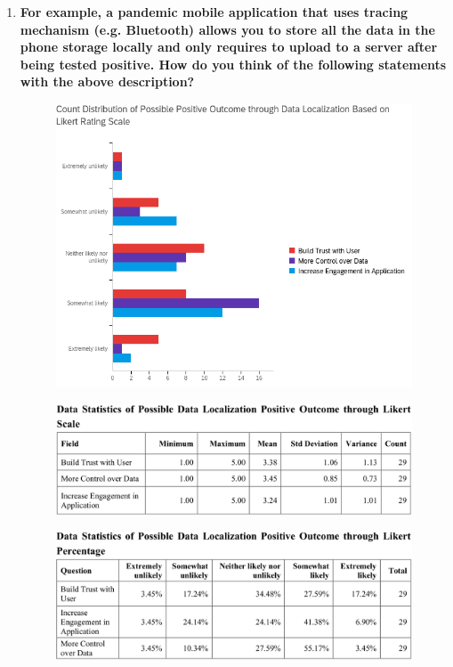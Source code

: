 \begin{enumerate}
\begin{figure}[H]
  \end{figure}
  \item \textbf{For example, a pandemic mobile application that uses tracing mechanism (e.g. Bluetooth) allows you to store all the data in the phone storage locally and only requires to upload to a server after being tested positive. How do you think of the following statements with the above description?}
  \begin{figure}[H]
    \centering
    \includegraphics[width=\linewidth]{img/prototype/app3-7.png}
  \end{figure}
  \begin{figure}[H]
    \centering
    \includegraphics[width=\linewidth]{img/prototype/app3-8.png}
  \end{figure}
  \begin{figure}[H]
    \centering
    \includegraphics[width=\linewidth]{img/prototype/app3-9.png}

\end{figure}
\end{enumerate}
